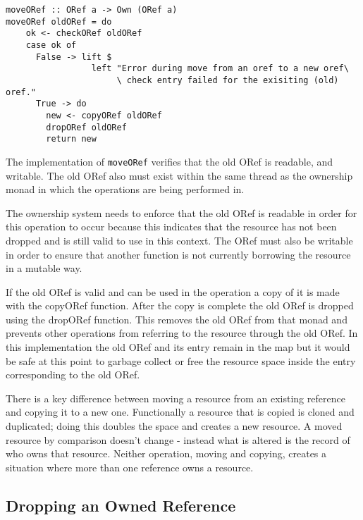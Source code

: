 \documentclass[onehalf,11pt]{beavtex}
\begin{document}
\begin{verbatim}
moveORef :: ORef a -> Own (ORef a)
moveORef oldORef = do
    ok <- checkORef oldORef
    case ok of
      False -> lift $ 
                 left "Error during move from an oref to a new oref\
                      \ check entry failed for the exisiting (old) oref."
      True -> do
        new <- copyORef oldORef
        dropORef oldORef
        return new
\end{verbatim}

The implementation of \texttt{moveORef} verifies that the old ORef is readable,
and writable. The old ORef also must exist within the same thread as the
ownership monad in which the operations are being performed in.

The ownership system needs to enforce that the old ORef is readable in order
for this operation to occur because this indicates that the resource has not
been dropped and is still valid to use in this context.
The ORef must also be writable in order to ensure that another function
is not currently borrowing the resource in a mutable way.

If the old ORef is valid and can be used in the operation a copy of it is made
with the copyORef function. After the copy is complete the old ORef is dropped
using the dropORef function. This removes the old ORef from that monad and
prevents other operations from referring to the resource through the old ORef.
In this implementation the old ORef and its entry remain in the map but
it would be safe at this point to garbage collect or free the resource space
inside the entry corresponding to the old ORef.


There is a key difference between moving a resource from an existing reference
and copying it to a new one.  Functionally a resource that is copied is cloned
and duplicated; doing this doubles the space and creates a new resource.
A moved resource by comparison doesn't change - instead what is altered is the
record of who owns that resource.  Neither operation, moving and copying,
creates a situation where more than one reference owns a resource.

\subsection{Dropping an Owned Reference}
\end{document}
